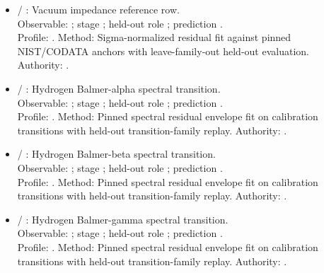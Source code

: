 \begin{itemize}
\item {} / : Vacuum impedance reference row.\\ Observable: ; stage ; held-out role ; prediction .\\ Profile: . Method: Sigma-normalized residual fit against pinned NIST/CODATA anchors with leave-family-out held-out evaluation. Authority: .
\item {} / : Hydrogen Balmer-alpha spectral transition.\\ Observable: ; stage ; held-out role ; prediction .\\ Profile: . Method: Pinned spectral residual envelope fit on calibration transitions with held-out transition-family replay. Authority: .
\item {} / : Hydrogen Balmer-beta spectral transition.\\ Observable: ; stage ; held-out role ; prediction .\\ Profile: . Method: Pinned spectral residual envelope fit on calibration transitions with held-out transition-family replay. Authority: .
\item {} / : Hydrogen Balmer-gamma spectral transition.\\ Observable: ; stage ; held-out role ; prediction .\\ Profile: . Method: Pinned spectral residual envelope fit on calibration transitions with held-out transition-family replay. Authority: .

\end{itemize}
